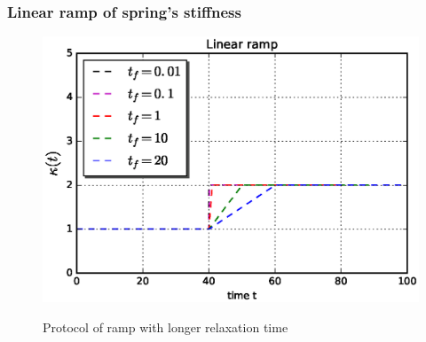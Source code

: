 \documentclass[11pt,a4paper]{article}
\begin{document}
%
%
%
%
%

\subsubsection*{Linear ramp of spring's stiffness}


\begin{figure}[!htbp]
\centering
\includegraphics[scale=0.67]{ramp_protocol2.eps}\\
\caption{ Protocol of ramp with longer relaxation time}
\label{protocol_ramp2}
\end{figure}
\end{document}
